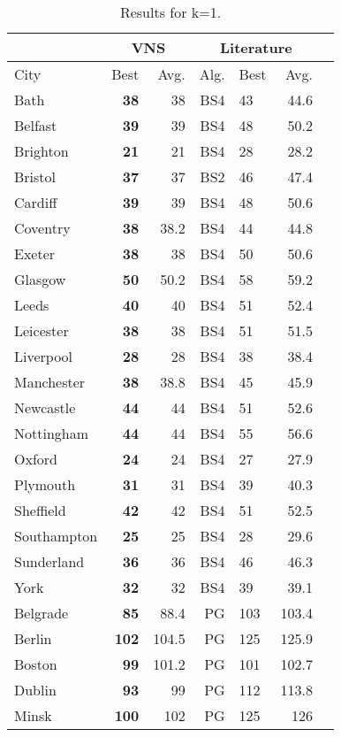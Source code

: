 \documentclass[dvipsnames,format=sigconf,anonymous=true,review=true]{acmart}
\begin{document}
  \begin{table}
  	\caption{Results for k=1.}
  	\label{tab:k1}  
 	\begin{tabular}{l|rr|rlrr}
 	\hline
 	\multicolumn{1}{c}{ } & \multicolumn{2}{|c}{VNS} & \multicolumn{3}{|c}{Literature} \\
 	\hline
	City & Best & Avg. & Alg. & Best & Avg. \\ \hline
	Bath&\bf{38}&38&BS4&43&44.6\\
	Belfast&\bf{39}&39&BS4&48&50.2\\
	Brighton&\bf{21}&21&BS4&28&28.2\\
	Bristol&\bf{37}&37&BS2&46&47.4\\
	Cardiff&\bf{39}&39&BS4&48&50.6\\
	Coventry&\bf{38}&38.2&BS4&44&44.8\\
	Exeter&\bf{38}&38&BS4&50&50.6\\
	Glasgow&\bf{50}&50.2&BS4&58&59.2\\
	Leeds&\bf{40}&40&BS4&51&52.4\\
	Leicester&\bf{38}&38&BS4&51&51.5\\
	Liverpool&\bf{28}&28&BS4&38&38.4\\
	Manchester&\bf{38}&38.8&BS4&45&45.9\\
	Newcastle&\bf{44}&44&BS4&51&52.6\\
	Nottingham&\bf{44}&44&BS4&55&56.6\\
	Oxford&\bf{24}&24&BS4&27&27.9\\
	Plymouth&\bf{31}&31&BS4&39&40.3\\
	Sheffield&\bf{42}&42&BS4&51&52.5\\
	Southampton&\bf{25}&25&BS4&28&29.6\\
	Sunderland&\bf{36}&36&BS4&46&46.3\\
	York&\bf{32}&32&BS4&39&39.1\\  \hline  \hline
	Belgrade&\bf{85}&88.4&PG&103&103.4\\
	Berlin&\bf{102}&104.5&PG&125&125.9\\
	Boston&\bf{99}&101.2&PG&101&102.7\\
	Dublin&\bf{93}&99&PG&112&113.8\\
	Minsk&\bf{100}&102&PG&125&126\\
	\hline

	
 	\end{tabular}
 \end{table}
\end{document}
